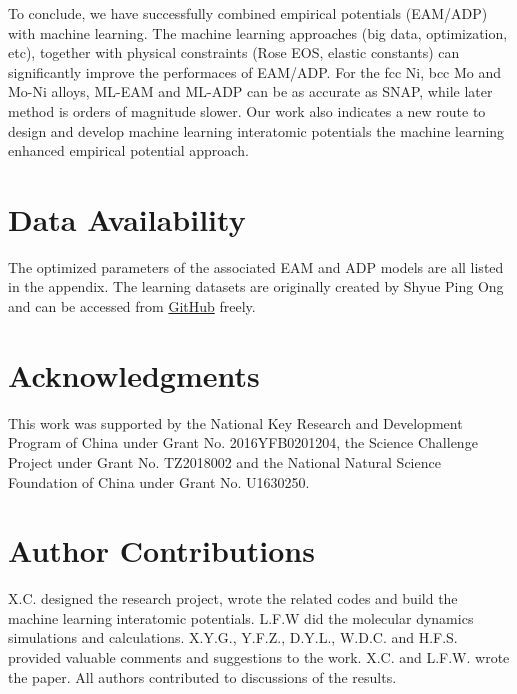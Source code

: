 \documentclass[final,3p,times]{elsarticle}
\begin{document}
To conclude, we have successfully combined empirical potentials (EAM/ADP) with 
machine learning. The machine learning approaches (big data, optimization, etc), 
together with physical constraints (Rose EOS, elastic constants) can 
significantly improve the performaces of EAM/ADP. For the fcc Ni, bcc Mo and 
Mo-Ni alloys, ML-EAM and ML-ADP can be as accurate as SNAP, while later method 
is orders of magnitude slower. Our work also indicates a new route to design and 
develop machine learning interatomic potentials \textemdash the machine learning 
enhanced empirical potential approach.

% 
%
\section*{Data Availability}
The optimized parameters of the associated EAM and ADP models are all listed in 
the appendix. The learning datasets are originally created by Shyue Ping Ong 
and can be accessed from 
\href{https://github.com/materialsvirtuallab/snap}{GitHub} freely.

% 
%
\section*{Acknowledgments}
\label{sec:acknowledgments}

This work was supported by the National Key Research and Development Program of 
China under Grant No. 2016YFB0201204, the Science Challenge Project under Grant 
No. TZ2018002 and the National Natural Science Foundation of China under Grant 
No. U1630250.

% 
%
\section*{Author Contributions}
X.C. designed the research project, wrote the related codes and build the 
machine learning interatomic potentials. L.F.W did the molecular dynamics 
simulations and calculations. X.Y.G., Y.F.Z., D.Y.L., W.D.C. and H.F.S. provided 
valuable comments and suggestions to the work. X.C. and L.F.W. wrote the paper. 
All authors contributed to discussions of the results.
\end{document}

